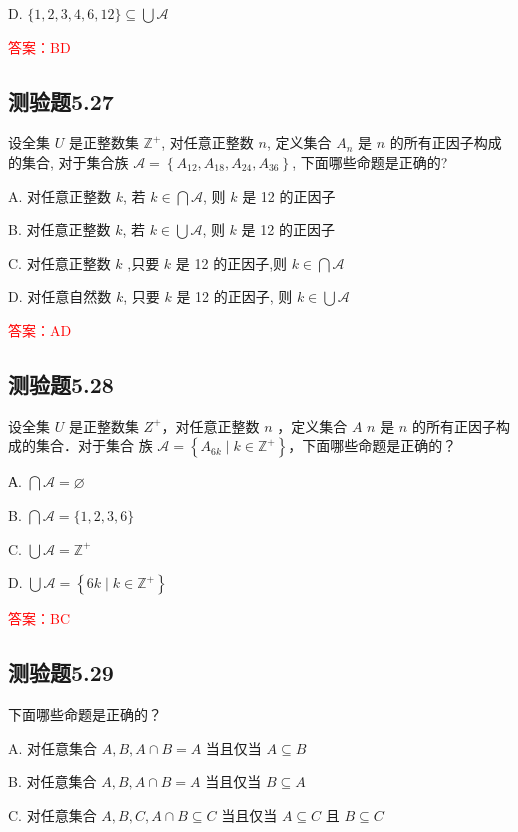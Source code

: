 \documentclass[UTF8, heading=true]{ctexart}
\begin{document}
D. $\{1,2,3,4,6,12\} \subseteq \bigcup \mathcal{A}$

\textcolor{red}{答案：BD}

\subsection{测验题5.27}

设全集 $U$ 是正整数集 $\mathbb{Z}^{+}$, 对任意正整数 $n$, 定义集合 $A_n$ 是 $n$ 的所有正因子构成的集合, 对于集合族 $\mathcal{A}=\left\{A_{12}, A_{18}, A_{24}, A_{36}\right\}$, 下面哪些命题是正确的?

A. 对任意正整数 $k$, 若 $k \in \bigcap \mathcal{A}$, 则 $k$ 是 12 的正因子

B. 对任意正整数 $k$, 若 $k \in \bigcup \mathcal{A}$, 则 $k$ 是 12 的正因子

C. 对任意正整数 $k$ ,只要 $k$ 是 12 的正因子,则 $k \in \bigcap \mathcal{A}$

D. 对任意自然数 $k$, 只要 $k$ 是 12 的正因子, 则 $k \in \bigcup \mathcal{A}$

\textcolor{red}{答案：AD}

\subsection{测验题5.28}

设全集 $U$ 是正整数集 $Z^{+}$，对任意正整数 $n$ ，定义集合 $A$ $n$ 是 $n$ 的所有正因子构成的集合．对于集合
族 $\mathcal{A}=\left\{A_{6 k} \mid k \in \mathbb{Z}^{+}\right\}$，下面哪些命题是正确的？

А. $\bigcap \mathcal{A}=\varnothing$

B. $\bigcap \mathcal{A}=\{1,2,3,6\}$

C. $\bigcup \mathcal{A}=\mathbb{Z}^{+}$

D. $\bigcup \mathcal{A}=\left\{6 k \mid k \in \mathbb{Z}^{+}\right\}$

\textcolor{red}{答案：BC}



\subsection{测验题5.29}
下面哪些命题是正确的？

A. 对任意集合 $A, B, A \cap B=A$ 当且仅当 $A \subseteq B$

B. 对任意集合 $A, B, A \cap B=A$ 当且仅当 $B \subseteq A$

C. 对任意集合 $A, B, C, A \cap B \subseteq C$ 当且仅当 $A \subseteq C$ 且 $B \subseteq C$
\end{document}
